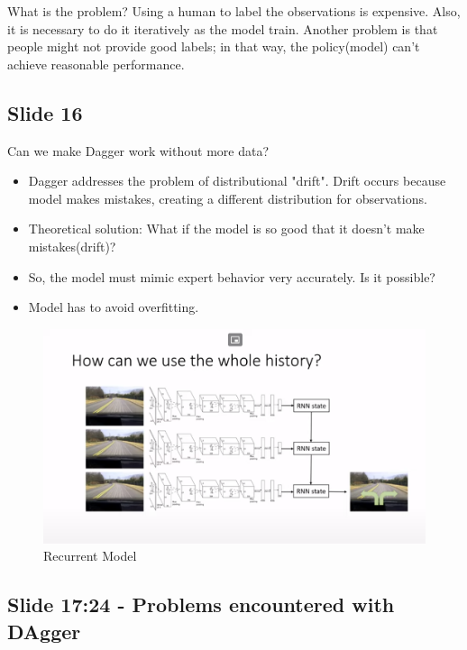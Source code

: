 \documentclass[]{article}
\begin{document}
\par What is the problem? Using a human to label the observations is expensive. Also, it is necessary to do it
iteratively as the model train. Another problem is that people might not provide good labels; in that way, the
policy(model) can't achieve reasonable performance.

\subsection*{Slide 16}%
\label{sub:Slide 16}
Can we make Dagger work without more data?
\begin{itemize}
    \item Dagger addresses the problem of distributional "drift". Drift occurs because model makes mistakes,
        creating a different distribution for observations.
    \item Theoretical solution: What if the model is so good that it doesn't make mistakes(drift)?
    \item So, the model must mimic expert behavior very accurately. Is it possible?
    \item Model has to avoid overfitting. 
\end{itemize}


\begin{figure}
\begin{center}
    \includegraphics[scale=0.4]{cap2img/slide18.png}
\end{center}
\caption{Recurrent Model}
\label{fig:rnn}
\end{figure}

\subsection*{Slide 17:24 - Problems encountered with DAgger }%
\label{sub:Slide 17}
\end{document}
